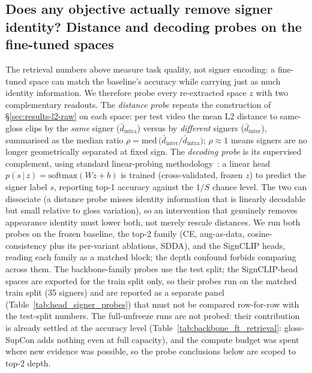 \subsection{Does any objective actually remove signer identity? Distance and
decoding probes on the fine-tuned spaces}
\label{sec:results-ft-probes}
The retrieval numbers above measure task quality, not signer encoding: a
fine-tuned space can match the baseline's accuracy while carrying just as
much identity information. We therefore probe every re-extracted space $z$
with two complementary readouts. The \emph{distance probe} repeats the
construction of \S\ref{sec:results-l2-raw} on each space: per test video the
mean L2 distance to same-gloss clips by the \emph{same} signer
($\bar{d}_{\mathrm{intra}}$) versus by \emph{different} signers
($\bar{d}_{\mathrm{inter}}$), summarised as the median ratio
$\rho=\mathrm{med}\,\big(\bar{d}_{\mathrm{inter}}/\bar{d}_{\mathrm{intra}}\big)$;
$\rho\!\approx\!1$ means signers are no longer geometrically separated at
fixed sign. The \emph{decoding probe} is its supervised complement, using standard
linear-probing methodology~\cite{alainUnderstandingIntermediateLayers2017}: a linear
head $p(s\,|\,z)=\mathrm{softmax}(Wz+b)$ is trained (cross-validated, frozen
$z$) to predict the signer label $s$, reporting top-1 accuracy against the
$1/S$ chance level. The two can dissociate (a distance probe misses
identity information that is linearly decodable but small relative to
gloss variation), so an intervention that genuinely removes appearance
identity must lower both, not merely rescale distances. We run both probes
on the frozen baseline, the top-2 family (CE, aug-as-data,
cosine-consistency plus its per-variant ablations, SDDA), and the SignCLIP
heads, reading each family as a matched block; the depth confound forbids
comparing across them. The backbone-family probes use the test split; the
SignCLIP-head spaces are exported for the train split only, so their probes
run on the matched train split (35 signers) and are reported as a separate
panel (Table~\ref{tab:head_signer_probes}) that must not be compared
row-for-row with the test-split numbers. The full-unfreeze runs are not probed: their
contribution is already settled at the accuracy level
(Table~\ref{tab:backbone_ft_retrieval}: gloss-SupCon adds nothing even at full
capacity), and the compute budget was spent where new evidence was possible,
so the probe conclusions below are scoped to top-2 depth.
